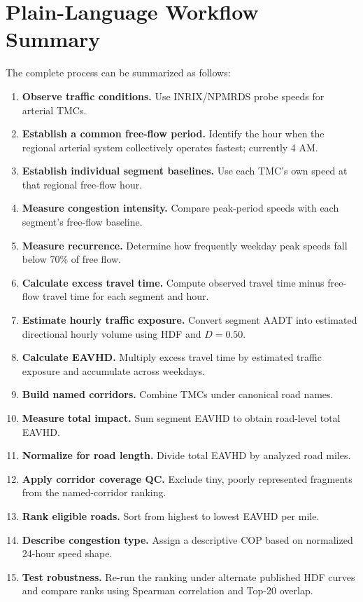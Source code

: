 \documentclass[11pt]{article}
\begin{document}
\section{Plain-Language Workflow Summary}

The complete process can be summarized as follows:

\begin{enumerate}
    \item \textbf{Observe traffic conditions.} Use INRIX/NPMRDS probe speeds for arterial TMCs.
    \item \textbf{Establish a common free-flow period.} Identify the hour when the regional arterial system collectively operates fastest; currently 4 AM.
    \item \textbf{Establish individual segment baselines.} Use each TMC's own speed at that regional free-flow hour.
    \item \textbf{Measure congestion intensity.} Compare peak-period speeds with each segment's free-flow baseline.
    \item \textbf{Measure recurrence.} Determine how frequently weekday peak speeds fall below 70\% of free flow.
    \item \textbf{Calculate excess travel time.} Compute observed travel time minus free-flow travel time for each segment and hour.
    \item \textbf{Estimate hourly traffic exposure.} Convert segment AADT into estimated directional hourly volume using HDF and $D=0.50$.
    \item \textbf{Calculate EAVHD.} Multiply excess travel time by estimated traffic exposure and accumulate across weekdays.
    \item \textbf{Build named corridors.} Combine TMCs under canonical road names.
    \item \textbf{Measure total impact.} Sum segment EAVHD to obtain road-level total EAVHD.
    \item \textbf{Normalize for road length.} Divide total EAVHD by analyzed road miles.
    \item \textbf{Apply corridor coverage QC.} Exclude tiny, poorly represented fragments from the named-corridor ranking.
    \item \textbf{Rank eligible roads.} Sort from highest to lowest EAVHD per mile.
    \item \textbf{Describe congestion type.} Assign a descriptive COP based on normalized 24-hour speed shape.
    \item \textbf{Test robustness.} Re-run the ranking under alternate published HDF curves and compare ranks using Spearman correlation and Top-20 overlap.
\end{enumerate}
\end{document}
